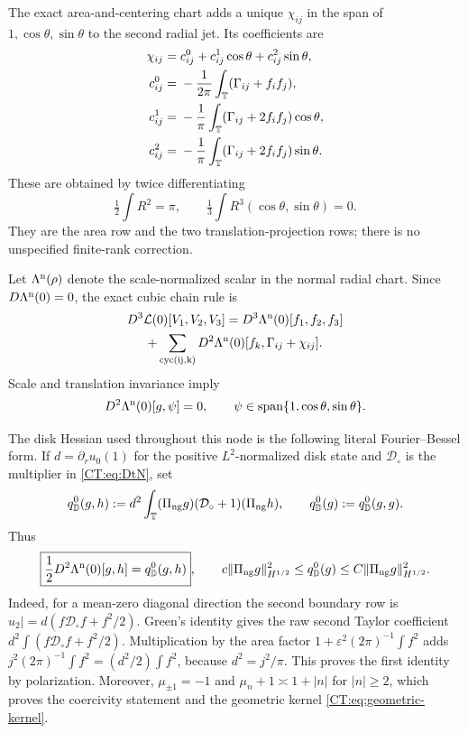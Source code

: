The exact area-and-centering chart adds a unique $\chi_{ij}$ in the span
of $1,\cos\theta,\sin\theta$ to the second radial jet.  Its coefficients
are
\begin{align}
 \chi_{ij}={}&c_{ij}^0+c_{ij}^1\cos\theta+c_{ij}^2\sin\theta,
 \label{CT:eq:chi}\\
 c_{ij}^0={}&-\frac1{2\pi}\int_\mathbb T
    (\Gamma_{ij}+f_if_j),\notag\\
 c_{ij}^1={}&-\frac1\pi\int_\mathbb T
    (\Gamma_{ij}+2f_if_j)\cos\theta,\notag\\
 c_{ij}^2={}&-\frac1\pi\int_\mathbb T
    (\Gamma_{ij}+2f_if_j)\sin\theta.\notag
\end{align}
These are obtained by twice differentiating
\[
 \tfrac12\int R^2=\pi,
 \qquad \tfrac13\int R^3(\cos\theta,\sin\theta)=0.
\]
They are the area row and the two translation-projection rows; there is no
unspecified finite-rank correction.

Let $\Lambda^{\rm n}(\rho)$ denote the scale-normalized scalar in the
normal radial chart.  Since $D\Lambda^{\rm n}(0)=0$, the exact cubic chain
rule is
\begin{multline}\label{CT:eq:physical-chain}
 D^3\mathcal L(0)[V_1,V_2,V_3]
 =D^3\Lambda^{\rm n}(0)[f_1,f_2,f_3]\\
 +\sum_{\rm cyc(ij,k)}D^2\Lambda^{\rm n}(0)
 [f_k,\Gamma_{ij}+\chi_{ij}].
\end{multline}
Scale and translation invariance imply
\begin{equation}\label{CT:eq:geometric-kernel}
 D^2\Lambda^{\rm n}(0)[g,\psi]=0,
 \qquad \psi\in\operatorname {span}\{1,\cos\theta,\sin\theta\}.
\end{equation}

The disk Hessian used throughout this node is the following literal
Fourier--Bessel form.  If
$d=\partial_ru_0(1)$ for the positive $L^2$-normalized disk state and
$\mathcal D_\circ$ is the multiplier in \eqref{CT:eq:DtN}, set
\begin{equation}\label{CT:eq:qD-definition}
 q_{\mathbb D}^{0}(g,h):=d^2\int_\mathbb T
  (\Pi_{\rm ng} g)(\mathcal D_\circ+1)(\Pi_{\rm ng} h),
 \qquad q_{\mathbb D}^{0}(g):=q_{\mathbb D}^{0}(g,g).
\end{equation}
Thus
\begin{equation}\label{CT:eq:disk-Hessian}
 \boxed{\frac12D^2\Lambda^{\rm n}(0)[g,h]=q_{\mathbb D}^{0}(g,h)},
 \qquad
 c\|\Pi_{\rm ng} g\|_{H^{1/2}}^2
 \le q_{\mathbb D}^{0}(g)\le
 C\|\Pi_{\rm ng} g\|_{H^{1/2}}^2.
\end{equation}
Indeed, for a mean-zero diagonal direction the second boundary row is
$u_2|=d(f\mathcal D_\circ f+f^2/2)$.  Green's identity gives the raw
second Taylor coefficient
$d^2\int(f\mathcal D_\circ f+f^2/2)$.  Multiplication by the area factor
$1+\varepsilon^2(2\pi)^{-1}\int f^2$ adds
$j^2(2\pi)^{-1}\int f^2=(d^2/2)\int f^2$, because
$d^2=j^2/\pi$.  This proves the first identity by polarization.
Moreover, $\mu_{\pm1}=-1$ and
$\mu_n+1\asymp1+|n|$ for $|n|\ge2$, which proves the coercivity statement
and the geometric kernel \eqref{CT:eq:geometric-kernel}.

